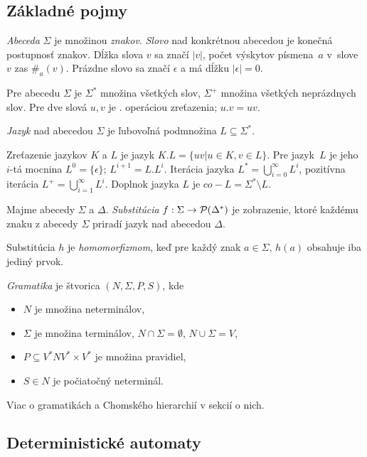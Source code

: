 \subsection{Základné pojmy}

{\em Abeceda} $\Sigma$ je množinou {\em znakov}. {\em Slovo} 
nad konkrétnou abecedou je konečná postupnosť znakov.
Dĺžka slova $v$ sa značí $|v|$, počet výskytov písmena~$a$
v~slove~$v$ zas $\#_a(v)$. Prázdne slovo sa značí $\epsilon$
a má dĺžku $|\epsilon|=0$.

Pre abecedu $\Sigma$ je $\Sigma^*$ množina všetkých slov,
$\Sigma^+$ množina všetkých neprázdnych slov. Pre dve slová
$u,v$ je $.$ operáciou zreťazenia; $u.v=uv$.

{\em Jazyk} nad abecedou $\Sigma$ je ľubovoľná podmnožina $L \subseteq\Sigma^*$.

Zreťazenie jazykov $K$ a $L$ je jazyk $K.L=\{ uv | u \in K, v \in L\}$.
Pre jazyk~$L$ je jeho $i$-tá mocnina $L^0=\{\epsilon\}$; $L^{i+1}=L.L^i$.
Iterácia jazyka $L^*=\bigcup_{i=0}^{\infty} L^i$, pozitívna
iterácia $L^+=\bigcup_{i=1}^{\infty} L^i$. Doplnok
jazyka $L$ je $co-L=\Sigma^* \setminus L$.

Majme abecedy $\Sigma$ a $\Delta$. {\em Substitúcia} $f : \Sigma \to \mathcal{P}(\Delta^*)$
je zobrazenie, ktoré každému znaku z abecedy $\Sigma$ priradí
jazyk nad abecedou $\Delta$.

Substitúcia $h$ je {\em homomorfizmom}, keď pre každý znak $a \in \Sigma$,
$h(a)$ obsahuje iba jediný prvok.

\begin{definition}
	{\em Gramatika} je štvorica $(N, \Sigma, P, S)$, kde
	\begin{itemize}
		\item $N$ je množina neterminálov,
		\item $\Sigma$ je množina terminálov, $N \cap \Sigma = \emptyset$, $N \cup \Sigma = V$,
		\item $P \subseteq V^*NV^* \times V^*$ je množina pravidiel,
		\item $S \in N$ je počiatočný neterminál.
	\end{itemize}
\end{definition}

Viac o gramatikách a Chomského hierarchií v sekcií o nich.

\subsection{Deterministické automaty}

